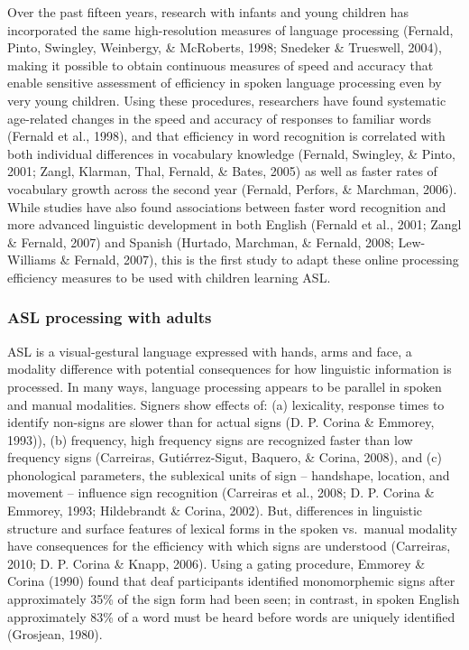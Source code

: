 \documentclass[12pt,]{article}
\begin{document}
Over the past fifteen years, research with infants and young children
has incorporated the same high-resolution measures of language
processing (Fernald, Pinto, Swingley, Weinbergy, \& McRoberts, 1998;
Snedeker \& Trueswell, 2004), making it possible to obtain continuous
measures of speed and accuracy that enable sensitive assessment of
efficiency in spoken language processing even by very young children.
Using these procedures, researchers have found systematic age-related
changes in the speed and accuracy of responses to familiar words
(Fernald et al., 1998), and that efficiency in word recognition is
correlated with both individual differences in vocabulary knowledge
(Fernald, Swingley, \& Pinto, 2001; Zangl, Klarman, Thal, Fernald, \&
Bates, 2005) as well as faster rates of vocabulary growth across the
second year (Fernald, Perfors, \& Marchman, 2006). While studies have
also found associations between faster word recognition and more
advanced linguistic development in both English (Fernald et al., 2001;
Zangl \& Fernald, 2007) and Spanish (Hurtado, Marchman, \& Fernald,
2008; Lew-Williams \& Fernald, 2007), this is the first study to adapt
these online processing efficiency measures to be used with children
learning ASL.

\subsubsection{ASL processing with
adults}\label{asl-processing-with-adults}

ASL is a visual-gestural language expressed with hands, arms and face, a
modality difference with potential consequences for how linguistic
information is processed. In many ways, language processing appears to
be parallel in spoken and manual modalities. Signers show effects of:
(a) lexicality, response times to identify non-signs are slower than for
actual signs (D. P. Corina \& Emmorey, 1993)), (b) frequency, high
frequency signs are recognized faster than low frequency signs
(Carreiras, Guti{é}rrez-Sigut, Baquero, \& Corina, 2008), and (c)
phonological parameters, the sublexical units of sign -- handshape,
location, and movement -- influence sign recognition (Carreiras et al.,
2008; D. P. Corina \& Emmorey, 1993; Hildebrandt \& Corina, 2002). But,
differences in linguistic structure and surface features of lexical
forms in the spoken vs.~manual modality have consequences for the
efficiency with which signs are understood (Carreiras, 2010; D. P.
Corina \& Knapp, 2006). Using a gating procedure, Emmorey \& Corina
(1990) found that deaf participants identified monomorphemic signs after
approximately 35\% of the sign form had been seen; in contrast, in
spoken English approximately 83\% of a word must be heard before words
are uniquely identified (Grosjean, 1980).
\end{document}
